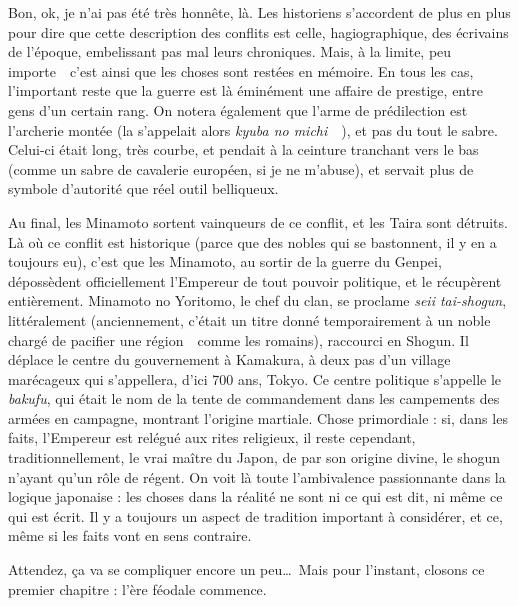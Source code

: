 Bon, ok, je n'ai pas été très honnête, là. Les historiens s'accordent de plus
en plus pour dire que cette description des conflits est celle,
hagiographique, des écrivains de l'époque, embelissant pas mal leurs
chroniques. Mais, à la limite, peu importe~\incise~c'est ainsi que les choses
sont restées en mémoire. En tous les cas, l'important reste que la guerre est
là éminément une affaire de prestige, entre gens d'un certain rang. On notera
également que l'arme de prédilection est l'archerie montée (la  s'appelait alors \emph{kyuba no michi}~\incise~), et pas du tout le sabre. Celui-ci était long, très courbe, et
pendait à la ceinture tranchant vers le bas (comme un sabre de cavalerie
européen, si je ne m'abuse), et servait plus de symbole d'autorité que réel
outil belliqueux.

Au final, les Minamoto sortent vainqueurs de ce conflit, et les Taira sont
détruits. Là où ce conflit est historique (parce que des nobles qui se
bastonnent, il y en a toujours eu), c'est que les Minamoto, au sortir de la
guerre du Genpei, dépossèdent officiellement l'Empereur de tout pouvoir
politique, et le récupèrent entièrement. Minamoto no Yoritomo, le chef du
clan, se proclame \emph{seii tai-shogun}, littéralement  (anciennement, c'était un titre donné
temporairement à un noble chargé de pacifier une région~\incise~comme les
 romains), raccourci en Shogun. Il déplace le centre du
gouvernement à Kamakura, à deux pas d'un village marécageux qui s'appellera,
d'ici 700 ans, Tokyo. Ce centre politique s'appelle le \emph{bakufu}, qui
était le nom de la tente de commandement dans les campements des armées en
campagne, montrant l'origine martiale. Chose primordiale : si, dans les faits,
l'Empereur est relégué aux rites religieux, il reste cependant,
traditionnellement, le vrai maître du Japon, de par son origine divine, le
shogun n'ayant qu'un rôle de régent. On voit là toute l'ambivalence
passionnante dans la logique japonaise : les choses dans la réalité ne sont ni
ce qui est dit, ni même ce qui est écrit. Il y a toujours un aspect de
tradition important à considérer, et ce, même si les faits vont en sens
contraire.

Attendez, ça va se compliquer encore un peu\dots\ Mais pour l'instant, closons
ce premier chapitre : l'ère féodale commence.
